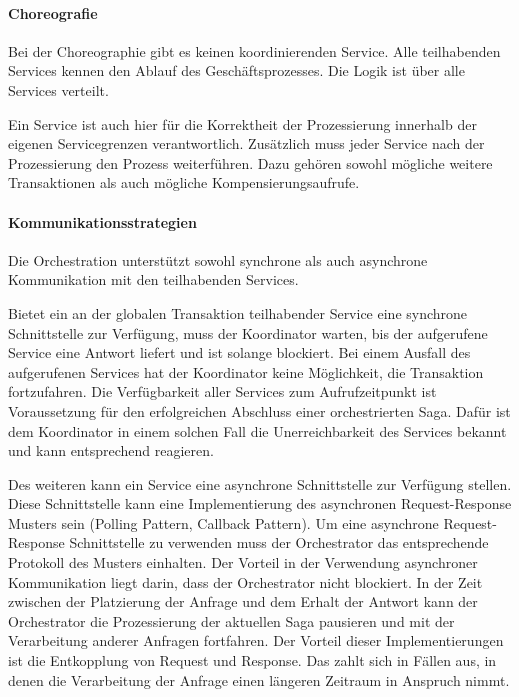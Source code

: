 \paragraph*{Choreografie}
Bei der Choreographie gibt es keinen koordinierenden Service. Alle teilhabenden Services kennen den Ablauf des Geschäftsprozesses. Die Logik ist über alle Services verteilt. 

Ein Service ist auch hier für die Korrektheit der Prozessierung innerhalb der eigenen Servicegrenzen verantwortlich. Zusätzlich muss jeder Service nach der Prozessierung den Prozess weiterführen. Dazu gehören sowohl mögliche weitere Transaktionen als auch mögliche Kompensierungsaufrufe. 


\paragraph*{Kommunikationsstrategien}
Die Orchestration unterstützt sowohl synchrone als auch asynchrone Kommunikation mit den teilhabenden Services. 

Bietet ein an der globalen Transaktion teilhabender Service eine synchrone Schnittstelle zur Verfügung, muss der Koordinator warten, bis der aufgerufene Service eine Antwort liefert und ist solange blockiert. Bei einem Ausfall des aufgerufenen Services hat der Koordinator keine Möglichkeit, die Transaktion fortzufahren. Die Verfügbarkeit aller Services zum Aufrufzeitpunkt ist Voraussetzung für den erfolgreichen Abschluss einer orchestrierten Saga. Dafür ist dem Koordinator in einem solchen Fall die Unerreichbarkeit des Services bekannt und kann entsprechend reagieren. 

Des weiteren kann ein Service eine asynchrone Schnittstelle zur Verfügung stellen. Diese Schnittstelle kann eine Implementierung des asynchronen Request-Response Musters sein (Polling Pattern, Callback Pattern). Um eine asynchrone Request-Response Schnittstelle zu verwenden muss der Orchestrator das entsprechende Protokoll des Musters einhalten. Der Vorteil in der Verwendung asynchroner Kommunikation liegt darin, dass der Orchestrator nicht blockiert. In der Zeit zwischen der Platzierung der Anfrage und dem Erhalt der Antwort kann der Orchestrator die Prozessierung der aktuellen Saga pausieren und mit der Verarbeitung anderer Anfragen fortfahren. Der Vorteil dieser Implementierungen ist die Entkopplung von Request und Response. Das zahlt sich in Fällen aus, in denen die Verarbeitung der Anfrage einen längeren Zeitraum in Anspruch nimmt.  

